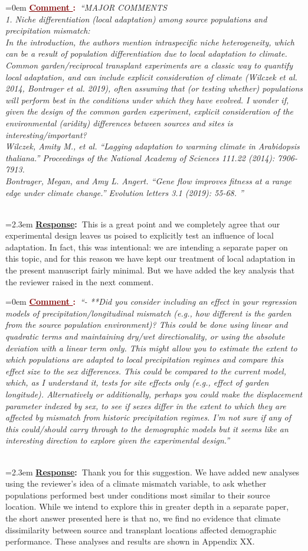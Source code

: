 \documentclass[12pt]{article}
\newcounter{cN}
\newcommand{\comment}[1]{
	\vspace{2em}
	\refstepcounter{cN} %
	\noindent \hangindent=0em \textbf{\textcolor{Maroon}{\uline{Comment \thecN}:~}}\emph{``#1''}
	}
\newcommand{\response}[1]{
	\\[0.25em]
	\hangindent=2.3em \textbf{\textcolor{NavyBlue}{\uline{Response}:~}}#1
	}
\begin{document}
\comment{MAJOR COMMENTS
	\\
	1. Niche differentiation (local adaptation) among source populations and precipitation mismatch:
	\\
	In the introduction, the authors mention intraspecific niche heterogeneity, which can be a result of population differentiation due to local adaptation to climate. Common garden/reciprocal transplant experiments are a classic way to quantify local adaptation, and can include explicit consideration of climate (Wilczek et al. 2014, Bontrager et al. 2019), often assuming that (or testing whether) populations will perform best in the conditions under which they have evolved. I wonder if, given the design of the common garden experiment, explicit consideration of the environmental (aridity) differences between sources and sites is interesting/important?
	\\
	Wilczek, Amity M., et al. ``Lagging adaptation to warming climate in Arabidopsis thaliana.'' Proceedings of the National Academy of Sciences 111.22 (2014): 7906-7913.
	\\
	Bontrager, Megan, and Amy L. Angert. ``Gene flow improves fitness at a range edge under climate change.'' Evolution letters 3.1 (2019): 55-68.
}
\response{This is a great point and we completely agree that our experimental design leaves us poised to explicitly test an influence of local adaptation. In fact, this was intentional: we are intending a separate paper on this topic, and for this reason we have kept our treatment of local adaptation in the present manuscript fairly minimal. But we have added the key analysis that the reviewer raised in the next comment.}

\comment{- **Did you consider including an effect in your regression models of precipitation/longitudinal mismatch (e.g., how different is the garden from the source population environment)? This could be done using linear and quadratic terms and maintaining dry/wet directionality, or using the absolute deviation with a linear term only. This might allow you to estimate the extent to which populations are adapted to local precipitation regimes and compare this effect size to the sex differences. This could be compared to the current model, which, as I understand it, tests for site effects only (e.g., effect of garden longitude). Alternatively or additionally, perhaps you could make the displacement parameter indexed by sex, to see if sexes differ in the extent to which they are affected by mismatch from historic precipitation regimes. I'm not sure if any of this could/should carry through to the demographic models but it seems like an interesting direction to explore given the experimental design.}
\response{Thank you for this suggestion. We have added new analyses using the reviewer's idea of a climate mismatch variable, to ask whether populations performed best under conditions most similar to their source location. While we intend to explore this in greater depth in a separate paper, the short answer presented here is that no, we find no evidence that climate dissimilarity between source and transplant locations affected demographic performance. These analyses and results are shown in Appendix XX.}
	
\end{document}
